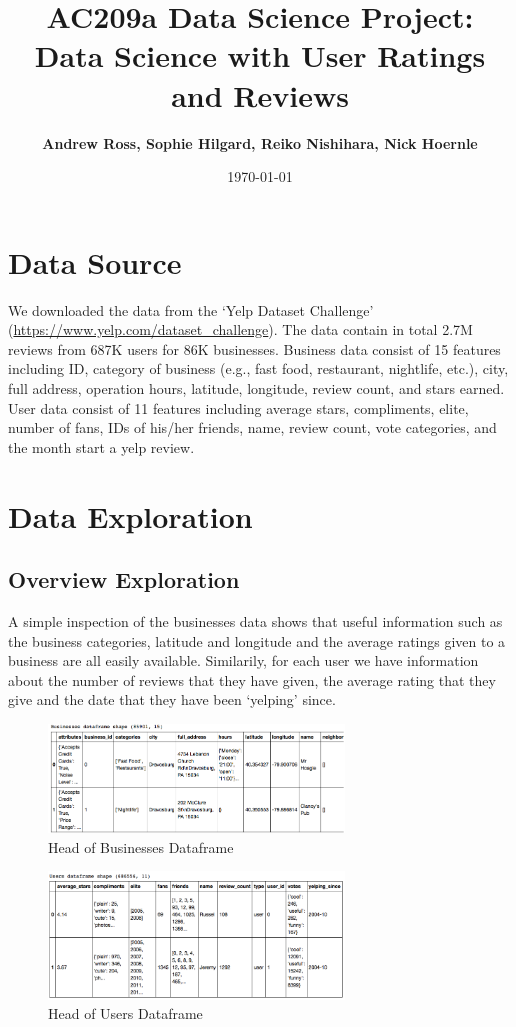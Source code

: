 \documentclass[11pt]{article}
\title{
\vspace{1cm}
\textmd{\textbf{AC209a Data Science Project: Data Science with User Ratings and Reviews}}\\
}
\author{\textbf{Andrew Ross, Sophie Hilgard, Reiko Nishihara, Nick Hoernle}}
\date{\today} %
\begin{document}
\maketitle

\section*{Data Source}
We downloaded the data from the `Yelp Dataset Challenge' (\url{https://www.yelp.com/dataset_challenge}). The data contain in total 2.7M reviews from 687K users for 86K businesses. Business data consist of 15 features including ID, category of business (e.g., fast food, restaurant, nightlife, etc.), city, full address, operation hours, latitude, longitude, review count, and stars earned. User data consist of 11 features including average stars, compliments, elite, number of fans, IDs of his/her friends, name, review count, vote categories, and the month start a yelp review.

\section*{Data Exploration}

\subsection*{Overview Exploration}

\par A simple inspection of the businesses data shows that useful information such as the business categories, latitude and longitude and the average ratings given to a business are all easily available. Similarily, for each user we have information about the number of reviews that they have given, the average rating that they give and the date that they have been `yelping' since.

\begin{figure}[H]
\centering
\includegraphics[width=0.7\textwidth]{./ac209/bizdataframe.png}
\caption{Head of Businesses Dataframe}
\end{figure}

\begin{figure}[H]
\centering
\includegraphics[width=0.7\textwidth]{./ac209/userdataframe.png}
\caption{Head of Users Dataframe}
\end{figure}
\end{document}
